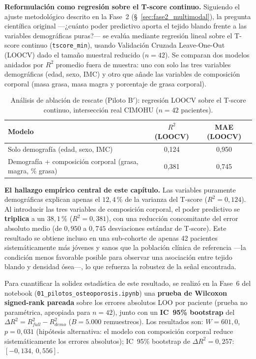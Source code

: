 \documentclass[../tesis.tex]{subfiles}
\begin{document}
\textbf{Reformulación como regresión sobre el T-score continuo.} Siguiendo el ajuste metodológico descrito en la Fase~2 (§~\ref{sec:fase2_multimodal}), la pregunta científica original ---¿cuánto poder predictivo aporta el tejido blando frente a las variables demográficas puras?--- se evalúa mediante regresión lineal sobre el T-score continuo (\texttt{tscore\_min}), usando Validación Cruzada Leave-One-Out (LOOCV) dado el tamaño muestral reducido ($n = 42$). Se comparan dos modelos anidados por $R^2$ promedio fuera de muestra: uno con solo las tres variables demográficas (edad, sexo, IMC) y otro que añade las variables de composición corporal (masa grasa, masa magra y porcentaje de grasa corporal).

\begin{table}[h]
\centering
\caption[Análisis de ablación de rescate (Piloto B$'$)]{Análisis de ablación de rescate (Piloto B$'$): regresión LOOCV sobre el T-score continuo, intersección real CIMOHU ($n = 42$ pacientes).}
\label{tab:pilotob}
\begin{tabular}{lcc}
\toprule
\textbf{Modelo} & \textbf{$R^2$ (LOOCV)} & \textbf{MAE (LOOCV)} \\
\midrule
Solo demografía (edad, sexo, IMC)                     & 0{,}124 & 0{,}950 \\
Demografía + composición corporal (grasa, magra, \% grasa) & 0{,}381 & 0{,}745 \\
\bottomrule
\end{tabular}
\end{table}

\textbf{El hallazgo empírico central de este capítulo.} Las variables puramente demográficas explican apenas el $12{,}4$\,\% de la varianza del T-score ($R^2 = 0{,}124$). Al introducir las tres variables de composición corporal, el poder predictivo se \textbf{triplica} a un $38{,}1$\,\% ($R^2 = 0{,}381$), con una reducción concomitante del error absoluto medio (de $0{,}950$ a $0{,}745$ desviaciones estándar de T-score). Este resultado se obtiene incluso en una sub-cohorte de apenas 42 pacientes sistemáticamente más jóvenes y sanos que la población clínica de referencia ---la condición menos favorable posible para observar una asociación entre tejido blando y densidad ósea---, lo que refuerza la robustez de la señal encontrada.

Para cuantificar la solidez estadística de este resultado, se realizó en la Fase~6 del notebook (\texttt{01\_pilotos\_osteoporosis.ipynb}) una \textbf{prueba de Wilcoxon signed-rank pareada} sobre los errores absolutos LOO por paciente (prueba no paramétrica, apropiada para $n=42$), junto con un \textbf{IC~95\% bootstrap} del $\Delta R^2 = R^2_{full} - R^2_{demo}$ ($B = 5.000$ remuestreos). Los resultados son: $W = 601{,}0$, $p = 0{,}031$ (hipótesis alternativa: el modelo con composición corporal reduce sistemáticamente los errores absolutos); IC~95\% bootstrap de $\Delta R^2 = 0{,}257$: $[-0{,}134,\ 0{,}556]$.
\end{document}
